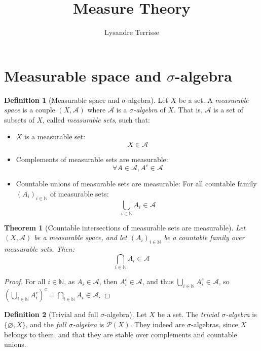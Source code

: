 \documentclass{article}
\title{Measure Theory}
\author{Lysandre Terrisse}
\newtheorem{theorem}{Theorem}[section]
\theoremstyle{definition}
\newtheorem{definition}{Definition}[section]
\theoremstyle{remark}
\theoremstyle{example}
\theoremstyle{notation}
\theoremstyle{axiom}
\begin{document}
\maketitle


\section{Measurable space and $\sigma$-algebra}

\begin{definition}[Measurable space and $\sigma$-algebra]
    Let $X$ be a set. A \textit{measurable space} is a couple $(X, \mathcal{A})$ where $\mathcal{A}$ is a \textit{$\sigma$-algebra} of $X$. That is, $\mathcal{A}$ is a set of subsets of $X$, called \textit{measurable sets}, such that:
    \begin{itemize}
        \item $X$ is a measurable set:
            $$X \in \mathcal{A}$$
        \item Complements of measurable sets are measurable:
            $$\forall A \in \mathcal{A}, A^c \in \mathcal{A}$$
        \item Countable unions of measurable sets are measurable: For all countable family $(A_i)_{i \in \mathbb{N}}$ of measurable sets:
            $$\bigcup_{i \in \mathbb{N}} A_i \in \mathcal{A}$$
    \end{itemize}
\end{definition}

\begin{theorem}[Countable intersections of measurable sets are measurable]
    Let $(X, \mathcal{A})$ be a measurable space, and let $(A_i)_{i \in \mathbb{N}}$ be a countable family over measurable sets. Then:
            $$\bigcap_{i \in \mathbb{N}} A_i \in \mathcal{A}$$
\end{theorem}

\begin{proof}
		For all $i \in \mathbb{N}$, as $A_i \in \mathcal{A}$, then $A_i^c \in \mathcal{A}$, and thus $\bigcup_{i \in \mathbb{N}} A_i^c \in \mathcal{A}$, so $\left(\bigcup_{i \in \mathbb{N}} A_i^c\right)^c = \bigcap_{i \in \mathbb{N}} A_i \in \mathcal{A}$.
\end{proof}

\begin{definition}[Trivial and full $\sigma$-algebra]
    Let $X$ be a set. The \textit{trivial $\sigma$-algebra} is $\{\varnothing, X\}$, and the \textit{full $\sigma$-algebra} is $\mathcal{P}(X)$. They indeed are $\sigma$-algebras, since $X$ belongs to them, and that they are stable over complements and countable unions.
\end{definition}
\end{document}
